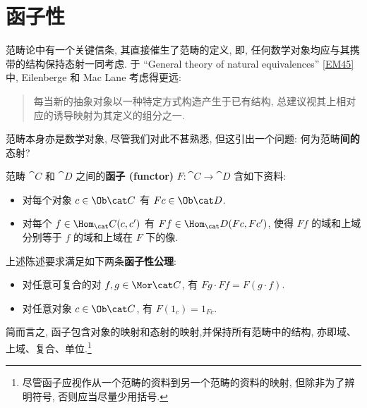 \section{函子性}\label{Sec:Functoriality} %
\par 范畴论中有一个关键信条, 其直接催生了范畴的定义, 即, 任何数学对象均应与其携带的结构保持态射一同考虑. 于 ``General theory of natural equivalences'' \ref{EM45} 中, Eilenberge 和 Mac Lane 考虑得更远:\begin{quote}
    每当新的抽象对象以一种特定方式构造产生于已有结构, 总建议视其上相对应的诱导映射为其定义的组分之一.
\end{quote}
范畴本身亦是数学对象, 尽管我们对此不甚熟悉, 但这引出一个问题: 何为范畴\textbf{间的}态射?
\begin{definition}
    范畴 \(\cat C\) 和 \(\cat D\) 之间的\textbf{函子 (functor)} \(F\colon\cat C\to\cat D\) 含如下资料:
    \begin{itemize}
        \item 对每个对象 \(c\in\Ob\cat C\) 有 \(Fc\in\Ob\cat D\).
        \item 对每个 \(f\in\Hom_\cat C(c,c')\) 有 \(Ff\in\Hom_\cat D(Fc,Fc')\), 使得 \(Ff\) 的域和上域分别等于 \(f\) 的域和上域在 \(F\) 下的像.
    \end{itemize}
    上述陈述要求满足如下两条\textbf{函子性公理}:
    \begin{itemize}
        \item 对任意可复合的对 \(f,g\in\Mor\cat C\), 有 \(Fg\cdot Ff=F(g\cdot f)\).
        \item 对任意对象 \(c\in\Ob\cat C\), 有 \(F(1_c)=1_{Fc}\).
    \end{itemize}
\end{definition}
\par 简而言之, 函子包含对象的映射和态射的映射,并保持所有范畴中的结构, 亦即域、上域、复合、单位.\footnote{尽管函子应视作从一个范畴的资料到另一个范畴的资料的映射, 但除非为了辨明符号, 否则应当尽量少用括号.}
